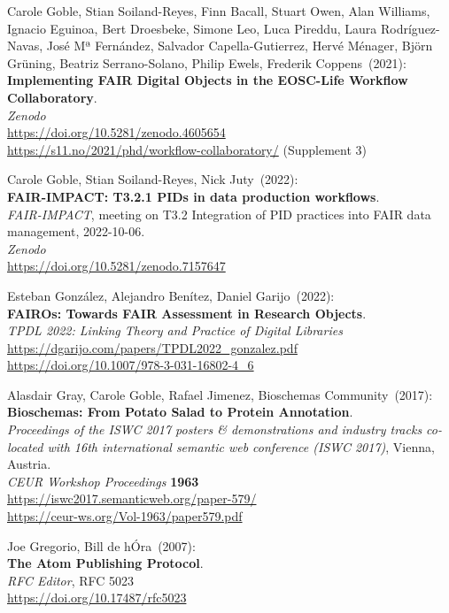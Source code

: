 \begin{thebibliography}{9}
Carole Goble, Stian Soiland-Reyes, Finn Bacall, Stuart
Owen, Alan Williams, Ignacio Eguinoa, Bert Droesbeke, Simone Leo, Luca
Pireddu, Laura Rodríguez-Navas, José Mª Fernández, Salvador
Capella-Gutierrez, Hervé Ménager, Björn Grüning, Beatriz Serrano-Solano,
Philip Ewels, Frederik Coppens~(2021): \\
\textbf{Implementing FAIR Digital Objects in the EOSC-Life Workflow Collaboratory}.\\
\emph{Zenodo}\\
\url{https://doi.org/10.5281/zenodo.4605654}\\
\url{https://s11.no/2021/phd/workflow-collaboratory/} (Supplement 3)

Carole Goble, Stian Soiland-Reyes, Nick Juty~(2022): \\
\textbf{FAIR-IMPACT: T3.2.1 PIDs in data production workflows}.\\
\emph{FAIR-IMPACT}, meeting on T3.2 Integration of PID practices into FAIR data management, 2022-10-06.\\
\emph{Zenodo}\\
\url{https://doi.org/10.5281/zenodo.7157647}

Esteban González, Alejandro Benítez, Daniel Garijo~(2022): \\
\textbf{FAIROs: Towards FAIR Assessment in Research Objects}.\\
\emph{TPDL 2022: Linking Theory and Practice of Digital Libraries}\\
\url{https://dgarijo.com/papers/TPDL2022_gonzalez.pdf}\\
\url{https://doi.org/10.1007/978-3-031-16802-4_6}

Alasdair Gray, Carole Goble, Rafael Jimenez, Bioschemas
Community~(2017): \\
\textbf{Bioschemas: From Potato Salad to Protein Annotation}.\\
\emph{Proceedings of the ISWC 2017 posters \& demonstrations and
industry tracks co-located with 16th international semantic web
conference (ISWC 2017)}, Vienna, Austria.\\
\emph{CEUR Workshop Proceedings} \textbf{1963} \\
\url{https://iswc2017.semanticweb.org/paper-579/} \\
\url{https://ceur-ws.org/Vol-1963/paper579.pdf}

Joe Gregorio, Bill de hÓra~(2007): \\
\textbf{The {Atom Publishing Protocol}}.\\
\emph{RFC Editor}, RFC 5023\\
\url{https://doi.org/10.17487/rfc5023}


\end{thebibliography}
